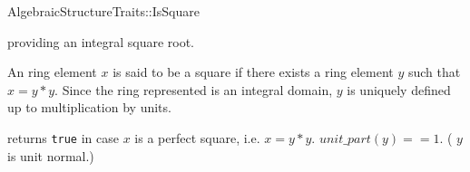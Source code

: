 

\begin{ccRefConcept}{AlgebraicStructureTraits::IsSquare}

\begin{ccAdvanced}
\ccDefinition

 providing an integral square root. 

An ring element $x$ is said to be a square if there exists a ring element $y$ such 
that $x= y*y$. Since the ring represented is an integral domain, 
$y$ is uniquely defined up to multiplication by units. 

\ccRefines 


\ccTypes

\ccGlue
{}\ccGlue
{}

\ccOperations

        { returns {\tt true} in case $x$ is a perfect square, i.e. $x = y*y$.
          \ccPostcond $unit\_part(y) == 1$. ( $y$ is unit normal.) 
        }


\ccSeeAlso

\end{ccAdvanced}

\end{ccRefConcept} 